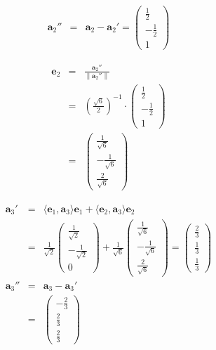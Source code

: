 \documentclass[dvipdfmx,autodetect-engine]{jsarticle}
\theoremstyle{definition}
\begin{document}
\begin{eqnarray*}
\bm{a}_2'' &= &\bm{a}_2 - \bm{a}_2' = \begin{pmatrix}
\frac{1}{2} \\[1.5ex]
-\frac{1}{2} \\[1.5ex]
1
\end{pmatrix}
\end{eqnarray*}

\begin{eqnarray*}
\bm{e}_2 &= &\frac{\bm{a}_2''}{\|\bm{a}_2''\|} \\
&=&\left(\frac{\sqrt{6}}{2}\right)^{-1} \cdot \begin{pmatrix}
\frac{1}{2} \\[1.5ex]
-\frac{1}{2} \\[1.5ex]
1
\end{pmatrix} \\
&=&\begin{pmatrix}
\frac{1}{\sqrt{6}} \\[1.5ex]
-\frac{1}{\sqrt{6}} \\[1.5ex]
\frac{2}{\sqrt{6}}
\end{pmatrix}
\end{eqnarray*}

\begin{eqnarray*}
\bm{a}_3' &= &\langle \bm{e}_1, \bm{a}_3 \rangle\bm{e}_1 + \langle \bm{e}_2, \bm{a}_3 \rangle\bm{e}_2 \\
&= & \frac{1}{\sqrt{2}} \begin{pmatrix}
\frac{1}{\sqrt{2}} \\[1.5ex]
-\frac{1}{\sqrt{2}} \\[1.5ex]
0
\end{pmatrix} + \frac{1}{\sqrt{6}}\begin{pmatrix}
\frac{1}{\sqrt{6}} \\[1.5ex]
-\frac{1}{\sqrt{6}} \\[1.5ex]
\frac{2}{\sqrt{6}}
\end{pmatrix} = \begin{pmatrix}
\frac{2}{3} \\[1.5ex]
\frac{1}{3} \\[1.5ex]
\frac{1}{3}
\end{pmatrix} \\
\bm{a}_3'' &=& \bm{a}_3 - \bm{a}_3' \\
&=& \begin{pmatrix}
-\frac{2}{3} \\[1.5ex]
\frac{2}{3} \\[1.5ex]
\frac{2}{3}
\end{pmatrix} \\
\end{eqnarray*}
\end{document}
